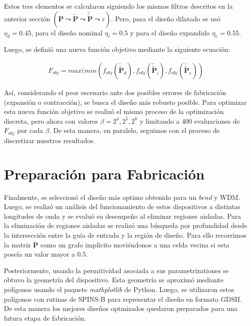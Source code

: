 Estos tres elementos se calcularon siguiendo los mismos filtros descritos en la anterior sección
$(\boldsymbol{P} \mathrel{\leadsto} \widetilde{\boldsymbol{P}} \mathrel{\leadsto}
\widetilde{\widetilde{\boldsymbol{P}}} \mathrel{\leadsto} \varepsilon)$.
Pero, para el diseño dilatado se usó $\eta_d = 0.45$, para el diseño nominal $\eta_i = 0.5$ y
para el diseño expandido $\eta_e = 0.55$.

Luego, se definió una nueva función objetivo mediante la siguiente ecuación:

\begin{equation}
  \begin{split}
    F_{obj} = max(min(
    f_{obj}(\widetilde{\widetilde{\boldsymbol{P}}}_{d}),
    f_{obj}(\widetilde{\widetilde{\boldsymbol{P}}}_{i}),
    f_{obj}(\widetilde{\widetilde{\boldsymbol{P}}}_{e})
    )
  \end{split}
  \label{eq:final-fom}
\end{equation}

Así, considerando el peor escenario ante dos posibles errores de fabricación (expansión o contracción),
se busca el diseño más robusto posible.
Para optimizar esta nueva función objetivo se realizó el mismo proceso de la optimización discreta, pero ahora
con valores $\beta = 2^4, 2^5, 2^6$ y limitando a 400 evaluaciones de $F_{obj}$ por cada $\beta$. 
De esta manera, en paralelo, seguimos con el proceso de discretizar
nuestros resultados.

\section{Preparación para Fabricación}

Finalmente, se seleccionó el diseño más optimo obtenido para un \emph{bend} y WDM.
Luego, se realizó un análisis del funcionamiento de estos dispositivos a distintas longitudes de onda
y se evaluó su desempeño al eliminar regiones aisladas.
Para la eliminación de regiones aisladas se realizó una búsqueda por profundidad
desde la intersección entre la guía de entrada y la región de diseño.
Para ello recorrimos la matriz $\boldsymbol{P}$ como un grafo implícito moviéndonos a una celda
vecina si esta poseía un valor mayor a 0.5.

Posteriormente, usando la permitividad asociada a sus parametrizationes se obtuvo la geometría del dispositivo.
Esta geometría se aproximó mediante polígonos usando el paquete \emph{mathplotlib} de Python.
Luego, se utilizaron estos polígonos con rutinas de SPINS-B
para representar el diseño en formato GDSII.
De esta manera los mejores diseños optmizados quedaron preparados para una 
futura etapa de fabricación.

